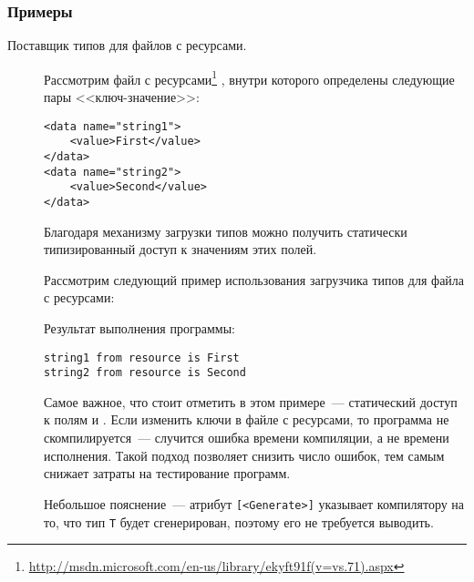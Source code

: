 \subsubsection{Примеры}
\begin{description}
\item[Поставщик типов для файлов с ресурсами.]
Рассмотрим файл с ресурсами\footnote{\url{http://msdn.microsoft.com/en-us/library/ekyft91f(v=vs.71).aspx}} , внутри которого определены следующие пары <<ключ-значение>>:
\begin{code}
\begin{lstlisting}[caption={Пример файла с ресурсами.}, label=resource-resx]
<data name="string1">
    <value>First</value>
</data>
<data name="string2">
    <value>Second</value>
</data>
\end{lstlisting}
\end{code}

Благодаря механизму загрузки типов можно получить статически типизированный доступ к значениям этих полей.

\clearpage

Рассмотрим следующий пример использования загрузчика типов для файла с ресурсами:

\begin{code}

\end{code}
\begin{code}
Результат выполнения программы:
\begin{lstlisting}[caption={Результат выполнения программы \ref{resource-type-provider}.}]
string1 from resource is First
string2 from resource is Second
\end{lstlisting}
\end{code}

Самое важное, что стоит отметить в этом примере~--- статический доступ к полям  и . Если изменить ключи в файле с ресурсами, то программа не скомпилируется~--- случится ошибка времени компиляции, а не времени исполнения. Такой подход позволяет снизить число ошибок, тем самым снижает затраты на тестирование программ.

Небольшое пояснение~--- атрибут \texttt{[<Generate>]} указывает компилятору на то, что тип \texttt{T} будет сгенерирован, поэтому его не требуется выводить.


\end{description}
